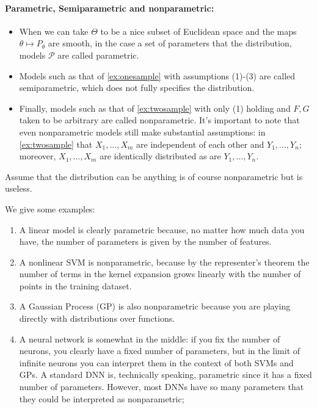 \documentclass{article}
\begin{document}
\paragraph{Parametric, Semiparametric and nonparametric:}
\begin{itemize}
\item {} When we can take $\Theta$ to be a nice subset of Euclidean space and the maps $\theta \mapsto P_{\theta}$ are smooth, in the case a set of parameters that  the distribution, models $\mathcal{P}$ are called parametric. 
    \item {}  Models such as that of \cref{ex:onesample} with assumptions (1)-(3) are called semiparametric, which does not fully specifies the distribution.
    \item {} Finally, models such as that of \cref{ex:twosample} with only (1) holding and $F, G$ taken to be arbitrary are called nonparametric. It's important to note that even nonparametric models still make substantial assumptions: in \cref{ex:twosample} that $X_{1}, \ldots, X_{m}$ are independent of each other and $Y_{1}, \ldots, Y_{n}$; moreover, $X_{1}, \ldots, X_{m}$ are identically distributed as are $Y_{1}, \ldots, Y_{n}$.
\end{itemize} 
\begin{rema}
Assume that the distribution can be anything is of course nonparametric but is useless.
\end{rema}
\begin{exma}We give some examples:
\begin{enumerate}
    \item A linear model is clearly parametric because, no matter how much data you have, the number of parameters is given by the number of features.
\item A nonlinear SVM is nonparametric, because by the representer’s theorem the number of terms in the kernel expansion grows linearly with the number of points in the training dataset.
\item A Gaussian Process (GP) is also nonparametric because you are playing directly with distributions over functions.
\item A neural network is somewhat in the middle: if you fix the number of neurons, you clearly have a fixed number of parameters, but in the limit of infinite neurons you can interpret them in the context of both SVMs and GPs. A standard DNN is, technically speaking, parametric since it has a fixed number of parameters. However, most DNNs have so many parameters that they could be interpreted as nonparametric; 
\end{enumerate}
\end{exma}
\end{document}
